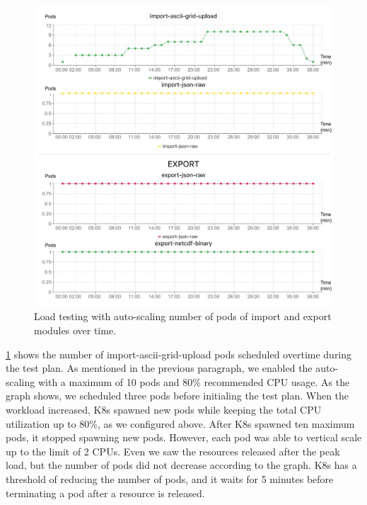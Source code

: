 \begin{figure}[htp]
    \centering
    \includegraphics[width=1.0\textwidth]{results/obs/all_auto/obs_all_auto_15m_import_export_pods.pdf}
    \caption{Load testing with auto-scaling number of pods of import and export modules over time.}
    \label{fi:obs_all_auto_15m_import_export_pods}
\end{figure}

\cref{fi:obs_all_auto_15m_import_export_pods} shows the number of import-ascii-grid-upload pods scheduled overtime during the test plan. As mentioned in the previous paragraph, we enabled the auto-scaling with a maximum of 10 pods and 80\% recommended CPU usage. As the graph shows, we scheduled three pods before initialing the test plan. When the workload increased, K8s spawned new pods while keeping the total CPU utilization up to 80\%, as we configured above. After K8s spawned ten maximum pods, it stopped spawning new pods. However, each pod was able to vertical scale up to the limit of 2 CPUs. Even we saw the resources released after the peak load, but the number of pods did not decrease according to the graph. K8s has a threshold of reducing the number of pods, and it waits for 5 minutes before terminating a pod after a resource is released.

